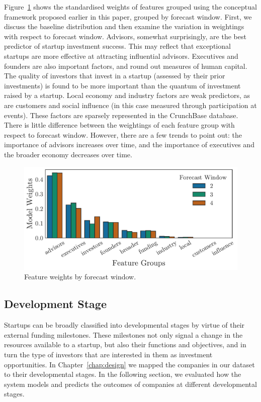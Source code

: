 \documentclass[../thesis/thesis.tex]{subfiles}
\begin{document}
Figure~\ref{fig:evaluation:features_window} shows the standardised weights of features grouped using the conceptual framework proposed earlier in this paper, grouped by forecast window. First, we discuss the baseline distribution and then examine the variation in weightings with respect to forecast window. Advisors, somewhat surprisingly, are the best predictor of startup investment success. This may reflect that exceptional startups are more effective at attracting influential advisors. Executives and founders are also important factors, and round out measures of human capital. The quality of investors that invest in a startup (assessed by their prior investments) is found to be more important than the quantum of investment raised by a startup. Local economy and industry factors are weak predictors, as are customers and social influence (in this case measured through participation at events). These factors are sparsely represented in the CrunchBase database. There is little difference between the weightings of each feature group with respect to forecast window. However, there are a few trends to point out: the importance of advisors increases over time, and the importance of executives and the broader economy decreases over time.

\begin{figure}[!htb]
    \centering
    \includegraphics[width=\textwidth]{../figures/evaluation/features_window}
    \caption[Feature weights by forecast window]{Feature weights by forecast window.}
    \label{fig:evaluation:features_window}
\end{figure}

\subsection{Development Stage}

Startups can be broadly classified into developmental stages by virtue of their external funding milestones. These milestones not only signal a change in the resources available to a startup, but also their functions and objectives, and in turn the type of investors that are interested in them as investment opportunities. In Chapter~\ref{chap:design} we mapped the companies in our dataset to their developmental stages. In the following section, we evaluated how the system models and predicts the outcomes of companies at different developmental stages.
\end{document}
